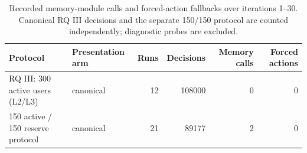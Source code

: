 \begin{table}[htbp!]
\centering
\small
\setlength{\tabcolsep}{3pt}
\renewcommand{\arraystretch}{1.1}
\begin{tabular}{llrrrr}
\hline
Protocol & Presentation arm & Runs & Decisions & Memory calls & Forced actions \\
\hline
RQ III: 300 active users (L2/L3) & canonical & 12 & 108000 & 0 & 0 \\
150 active / 150 reserve protocol & canonical & 21 & 89177 & 2 & 0 \\
\hline
\end{tabular}
\caption{Recorded memory-module calls and forced-action fallbacks over iterations 1--30. Canonical RQ III decisions and the separate 150/150 protocol are counted independently; diagnostic probes are excluded.}
\label{chap:results:tab:rq3_memory_forced_action_summary}
\end{table}

